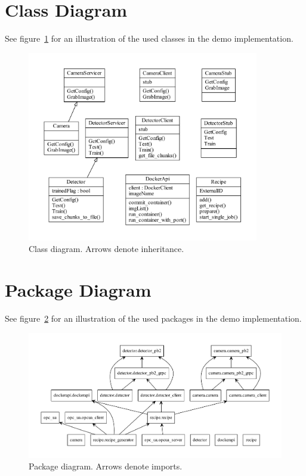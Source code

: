 \section{Class Diagram}
See figure~\ref{fig:Classes} for an illustration of the used classes in the demo implementation.
\begin{figure}[ht]
	\centering
  \includegraphics[width=0.9\textwidth]{img/classes.pdf}
	\caption[Class diagram]{Class diagram. Arrows denote inheritance.}
	\label{fig:Classes}
\end{figure}

\section{Package Diagram}
See figure~\ref{fig:Packages} for an illustration of the used packages in the demo implementation.
\begin{figure}[ht]
	\centering
  \includegraphics[width=\textwidth]{img/packages.pdf}
	\caption[Package diagram]{Package diagram. Arrows denote imports.}
	\label{fig:Packages}
\end{figure}

